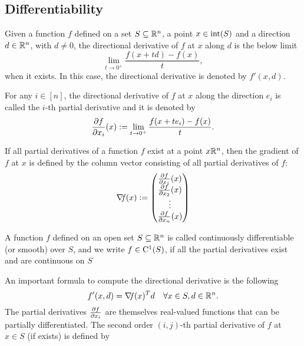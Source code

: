 \documentclass[10pt,a4paper]{article}
\begin{document}
\subsection{Differentiability}
\begin{definition}
	Given a function $f$ defined on a set $S\subseteq \mathbb{R}^n$, a point $x\in \mathord{\mathrm{int}}(S)$ and a direction $d\in \mathbb{R}^n$, with $d\neq0$, the directional derivative of $f$ at $x$ along $d$ is the below limit
	\begin{equation*}
		\lim_{t\to 0^+} \frac{f(x+td)-f(x)}{t},
	\end{equation*}
when it exists. In this case, the directional derivative is denoted by $f'(x,d)$.
\end{definition}
\begin{definition}
For any $i\in[n]$, the directional derivative of $f$ at $x$ along the direction $e_i$ is called the $i$-th partial derivative and it is denoted by 
\begin{equation*}
	\frac{\partial f}{\partial x_i}(x):=\lim_{t\to 0^+} \frac{f(x+te_i)-f(x)}{t}.
\end{equation*}
\end{definition}
\begin{definition}[Gradient]
	If all partial derivatives of a function $f$ exist at a point $x\mathbb{R}^n$, then the gradient of $f$ at $x$ is defined by the column vector consisting of all partial derivatives of $f$:
	\begin{equation*}
		\operatorname*{\mathit{\nabla \!f}} (x) := \begin{pmatrix}
			\frac{\partial f}{\partial x_1}(x)\\
			\frac{\partial f}{\partial x_2}(x)\\
			\vdots\\
			\frac{\partial f}{\partial x_n}(x)
		\end{pmatrix}
	\end{equation*}
\end{definition}
A function $f$ defined on an open set $S \subseteq \mathbb{R}^n$ is called continuously differentiable (or smooth) over $S$, and we write $f\in \mathord{\mathrm{C^1}}(S)$, if all the partial derivatives exist and are continuous on $S$
\par An important formula to compute the directional derivative is the following
\begin{equation*}
	f'(x,d) = \operatorname*{\mathit{\nabla \!f}}(x)^Td \quad \forall x \in S, d\in \mathbb{R}^n.
\end{equation*}
The partial derivatives $\frac{\partial f}{\partial x_i}$ are themselves real-valued functions that can be partially differentiated. The second order $(i,j)$-th partial derivative of $f$ at $x\in S$ (if exists) is defined by
\end{document}
